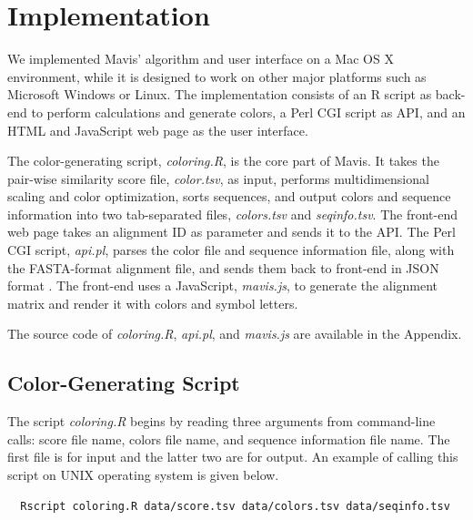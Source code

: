 \chapter{Implementation}\label{chap:Implementation}

We implemented Mavis' algorithm and user interface on a Mac OS X environment, while it is designed to work on other major platforms such as Microsoft Windows or Linux. The implementation consists of an R script as back-end to perform calculations and generate colors, a Perl CGI script as API, and an HTML and JavaScript web page as  the user interface.

The color-generating script, \emph{coloring.R}, is the core part of Mavis. It takes the pair-wise similarity score file, \emph{color.tsv}, as input, performs multidimensional scaling and color optimization, sorts sequences, and output colors and sequence information into two tab-separated files, \emph{colors.tsv} and \emph{seqinfo.tsv}. The front-end web page takes an alignment ID as parameter and sends it to the API. The Perl CGI script, \emph{api.pl}, parses the color file and sequence information file, along with the FASTA-format alignment file, and sends them back to front-end in JSON format \cite{crockford2006application}. The front-end uses a JavaScript, \emph{mavis.js}, to generate the alignment matrix and render it with colors and symbol letters.

The source code of \emph{coloring.R}, \emph{api.pl}, and \emph{mavis.js} are available in the Appendix.

\section{Color-Generating Script}

The script \emph{coloring.R} begins by reading three arguments from command-line calls: score file name, colors file name, and sequence information file name. The first file is for input and the latter two are for output. An example of calling this script on UNIX operating system is given below.
\begin{verbatim}
  Rscript coloring.R data/score.tsv data/colors.tsv data/seqinfo.tsv
\end{verbatim}


